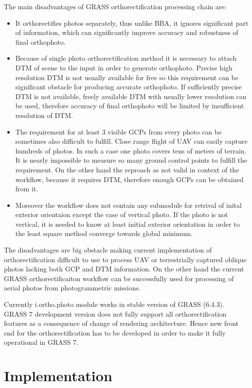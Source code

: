 \documentclass[a4paper,12pt]{article}
\begin{document}
The main disadvantages of GRASS orthorectification processing chain are:
\begin{itemize}
\item It orthorectifies photos separately, thus unlike BBA, it ignores significant part of information,
 which can significantly improve accuracy and robustness of final orthophoto. 
\item Because of single photo orthorectification method it is necessary to attach DTM of scene to the input 
in order to generate orthophoto. Precise high resolution DTM is not usually available for free so this 
requirement can be significant obstacle for producing accurate orthophoto. If sufficiently precise 
DTM is not available, freely available DTM with usually lower resolution can be used, therefore  
accuracy of final orthophoto will be limited by insufficient resolution of DTM.
\item The requirement for at least 3 visible GCPs from every photo can be sometimes also difficult to fulfill.
Close range flight of UAV can easily capture hundreds of photos.
In such a case one photo covers tens of meters
of terrain. It is nearly impossible to measure so many ground control points to fulfill the requirement. 
On the other hand the reproach as not valid in context of the workflow, because it requires DTM, therefore 
enough GCPs can be obtained from it.
\item Moreover the workflow does not contain any submodule for retrival of inital exterior orientaion except
 the case of vertical photo.   If the photo 
is not vertical, it is needed to know at least initial exterior orientation 
in order to the least square method converge towards global minimum.
\end{itemize}

The disadvantages are big obstacle making current implementation of orthorectification difficult to use  
to process UAV or terrestrially captured oblique photos lacking both GCP and DTM information.
On the other hand the current GRASS orthorectificaiton workflow can be successfully used for processing
of aerial photos from photogrammetric missions.

Currently i.ortho.photo module works in stable version of GRASS (6.4.3).
GRASS 7 development version does not fully support all orthorectification features 
as a consequence of change of rendering architecture.
Hence new front end for the 
orthorectification has to be developed in order to make it fully operational 
in GRASS 7. 

\section{Implementation}
\end{document}
